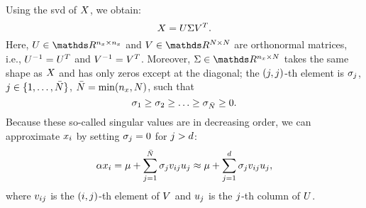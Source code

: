 Using the \ac{svd} of $X$, we obtain:
\begin{equation}
	X = U \Sigma V^T.
\end{equation}
Here, $\svdu \in \realnumbers^{\dimensionscenariopars \times \dimensionscenariopars}$ and $\svdv \in \realnumbers^{\scenariosnumberof \times \scenariosnumberof}$ are orthonormal matrices, i.e., $U^{-1}=U^T$ and $V^{-1}=V^T$.
Moreover, $\svds \in \realnumbers^{\dimensionscenariopars \times \scenariosnumberof}$ takes the same shape as $X$ and has only zeros except at the diagonal; the $(j,j)$-th element is $\sigma_{j}$, $j\in\{1,\ldots,\bar{N}\}$, $\bar{N} = \min(n_x,N)$, such that 
\begin{equation}
	\sigma_{1} \geq \sigma_{2} \geq \ldots \geq \sigma_{\bar{N}} \geq 0.
\end{equation}
Because these so-called singular values are in decreasing order, we can approximate $x_{i}$ by setting $\sigma_{j}=0$ for $j > d$:
\begin{equation}
	\label{eq:svd approximation}
	\alpha x_{i} 
	= \mu + \sum_{j=1}^{\bar{N}} \sigma_{j} v_{i j} u_{j}
	\approx \mu + \sum_{j=1}^{d} \sigma_{j} v_{i j} u_{j},
\end{equation}
where $v_{i j}$ is the $(i,j)$-th element of $V$ and $u_{j}$ is the $j$-th column of $U$.


